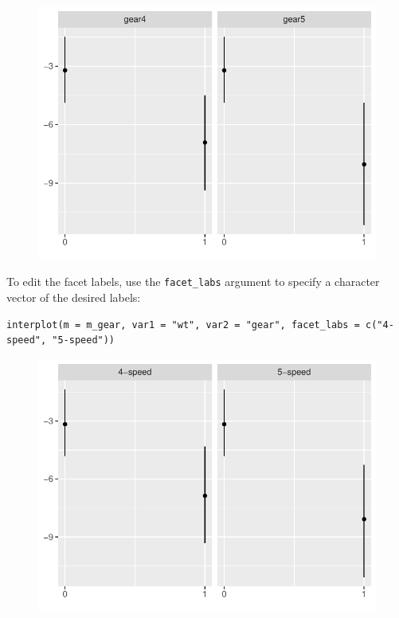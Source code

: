 \documentclass[
  article]{jss}
\begin{document}
\begin{figure}[H]

{\centering \includegraphics{jss_manuscript_files/figure-pdf/unnamed-chunk-10-1.pdf}

}

\end{figure}

To edit the facet labels, use the \texttt{facet\_labs} argument to
specify a character vector of the desired labels:

\begin{verbatim}
interplot(m = m_gear, var1 = "wt", var2 = "gear", facet_labs = c("4-speed", "5-speed"))
\end{verbatim}

\begin{figure}[H]

{\centering \includegraphics{jss_manuscript_files/figure-pdf/unnamed-chunk-11-1.pdf}

}

\end{figure}
\end{document}
